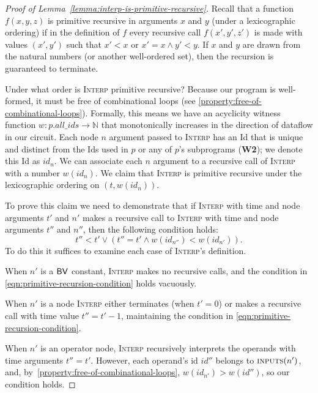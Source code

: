 \begin{proof}[Proof of Lemma~\ref{lemma:interp-is-primitive-recursive}]
Recall that a function $f(x,y,z)$ is
    primitive recursive in arguments $x$ and $y$
    (under a lexicographic ordering) 
    if in the definition of $f$ every
    recursive call $f(x',y',z')$ is made
    with values $(x',y')$ such that $x' < x$ 
    or $x' = x \wedge y' < y$.
    If $x$ and $y$
    are drawn from the natural numbers 
    (or another well-ordered set),
    then the recursion is guaranteed to terminate.

Under what order is 
  \textsc{Interp} primitive recursive?
Because our program
    is well-formed, it must be free
    of combinational loops (see \cref{property:free-of-combinational-loops}).
Formally, this means we have an acyclicity
    witness function $w : p.all\_ids \to \mathbb{N}$
    that monotonically increases in the direction of
    dataflow in our circuit.
Each node $n$ argument passed to \textsc{Interp}
    has an \textsf{Id} that is unique and distinct
    from the \textsf{Id}s used in $p$ or any of $p$'s
    subprograms (\textbf{W2});
    we denote this \textsf{Id} as $id_n$.
We can associate each $n$ argument
    to a recursive call of \textsc{Interp}
    with a number $w(id_n)$.
We claim that \textsc{Interp} is
    primitive recursive under
    the lexicographic ordering on $(t, w(id_n))$.
    
To prove this claim we need to demonstrate that
    if \textsc{Interp} with time and node
    arguments $t'$ and $n'$ makes a recursive
    call to  \textsc{Interp} with time and
    node arguments $t''$ and $n''$, then the following
    condition holds:
    \small
\begin{equation}
\label{eqn:primitive-recursion-condition}
    t'' < t' \vee \left(t'' = t' \wedge w(id_{n''}) < w(id_{n'})\right).
\end{equation}
\normalsize
To do this it suffices to examine each case of \textsc{Interp}'s definition.

When $n'$ is a $\mathsf{BV}$ constant,
    \textsc{Interp} makes no recursive calls,
    and the condition in \cref{eqn:primitive-recursion-condition}
    holds vacuously.
    
When $n'$ is a \IRReg{} node \textsc{Interp} either terminates
  (when $t'=0$) or makes a
  recursive call with time value $t'' = t' - 1$,
  maintaining the condition in \cref{eqn:primitive-recursion-condition}.
  
When $n'$ is an operator node, 
  \textsc{Interp} recursively interprets
  the operands with time arguments $t'' = t'$.
However, each operand's id $id''$ belongs to $\textsc{inputs}(n')$,
    and, by~\cref{property:free-of-combinational-loops},
    $w(id_{n'}) > w(id'')$,
    so our condition holds.
  

\end{proof}
